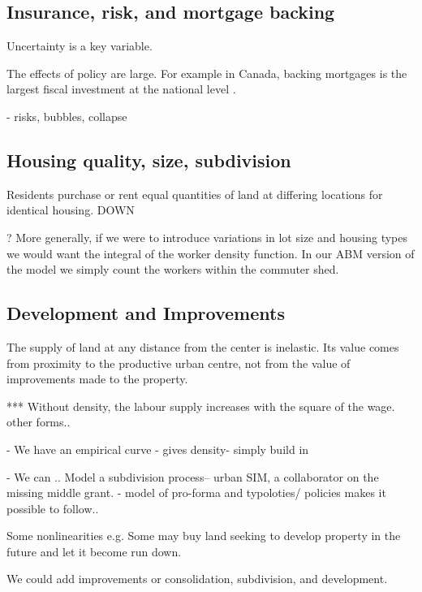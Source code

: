 \subsection{Insurance, risk, and mortgage backing}

Uncertainty is a key variable.

The effects of policy are large. For example in Canada, backing mortgages is the largest fiscal investment at the national level \cite{nemtinFinancializationHousingSocial2021}.

- risks, bubbles, collapse


\subsection{Housing quality, size, subdivision}
Residents  purchase or rent equal quantities of land at differing locations %
for identical housing.  DOWN

? More generally, if we were to introduce variations in lot size and housing types  we would want the integral of the worker density function. In our ABM version  of the model we simply count the workers within the commuter shed.

\subsection{Development and Improvements} \label{sec-extensions-conversion}
The supply of land at any distance from the center is inelastic. 
Its value comes from proximity to the productive urban centre, not from the value of improvements made to the property.

*** Without density, the labour supply increases with the square of the wage.  other forms..

- We have an empirical curve - gives density- simply build in

- We can .. Model a subdivision process-- urban SIM, a collaborator on the missing middle grant. - model of pro-forma and typoloties/ policies makes it possible to follow..

Some nonlinearities e.g. Some may buy land seeking to develop property in the future and let it become run down. 

We could add improvements
 or consolidation, subdivision, and development. 


